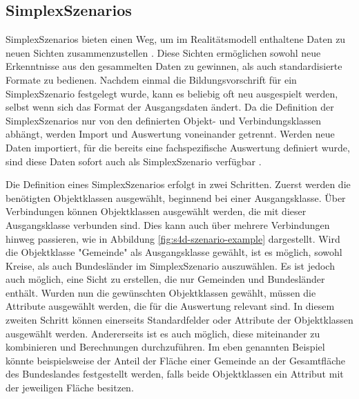 \subsection{SimplexSzenarios}
\label{sec:simplex-scenarios}

SimplexSzenarios bieten einen Weg, um im Realitätsmodell enthaltene Daten zu neuen Sichten zusammenzustellen \parencite{grossmannEnvVisioUniverselle2021}. Diese Sichten ermöglichen sowohl neue Erkenntnisse aus den gesammelten Daten zu gewinnen, als auch standardisierte Formate zu bedienen. Nachdem einmal die Bildungsvorschrift für ein SimplexSzenario festgelegt wurde, kann es beliebig oft neu ausgespielt werden, selbst wenn sich das Format der Ausgangsdaten ändert. Da die Definition der SimplexSzenarios nur von den definierten Objekt- und Verbindungsklassen abhängt, werden Import und Auswertung voneinander getrennt. Werden neue Daten importiert, für die bereits eine fachspezifische Auswertung definiert wurde, sind diese Daten sofort auch als SimplexSzenario verfügbar \parencite{rudolfUmweltdatenIntelligenz2021}.

Die Definition eines SimplexSzenarios erfolgt in zwei Schritten. Zuerst werden die benötigten Objektklassen ausgewählt, beginnend bei einer Ausgangsklasse. Über Verbindungen können Objektklassen ausgewählt werden, die mit dieser Ausgangsklasse verbunden sind. Dies kann auch über mehrere Verbindungen hinweg passieren, wie in Abbildung \ref{fig:s4d-szenario-example} dargestellt. Wird die Objektklasse "Gemeinde" als Ausgangsklasse gewählt, ist es möglich, sowohl Kreise, als auch Bundesländer im SimplexSzenario auszuwählen. Es ist jedoch auch möglich, eine Sicht zu erstellen, die nur Gemeinden und Bundesländer enthält. Wurden nun die gewünschten Objektklassen gewählt, müssen die Attribute ausgewählt werden, die für die Auswertung relevant sind. In diesem zweiten Schritt können einerseits Standardfelder oder Attribute der Objektklassen ausgewählt werden. Andererseits ist es auch möglich, diese miteinander zu kombinieren und Berechnungen durchzuführen. Im eben genannten Beispiel könnte beispielsweise der Anteil der Fläche einer Gemeinde an der Gesamtfläche des Bundeslandes festgestellt werden, falls beide Objektklassen ein Attribut mit der jeweiligen Fläche besitzen.

